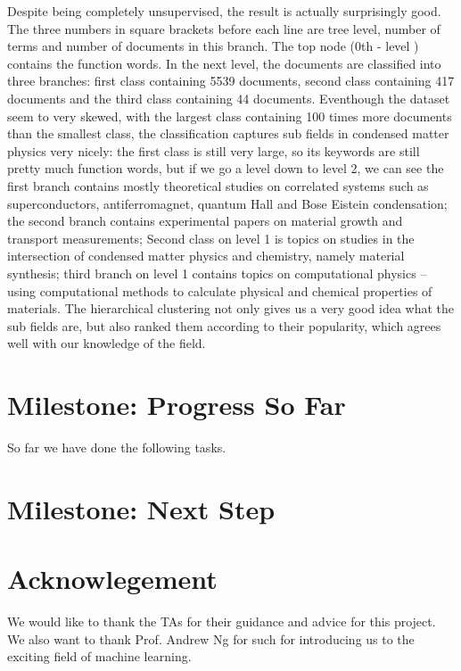 \documentclass[DIV=calc, paper=a4, fontsize=11pt, twocolumn]{scrartcl}	 %
\begin{document}
\newline
Despite being completely unsupervised, the result is actually surprisingly good. The three numbers in square brackets before each line are tree level, number of terms and number of documents in this branch. The top node (0th - level ) contains the function words. In the next level, the documents are classified into three branches: first class containing 5539 documents, second class containing 417 documents and the third class containing 44 documents. Eventhough the dataset seem to very skewed, with the largest class containing 100 times more documents than the smallest class, the classification captures sub fields in condensed matter physics very nicely: the first class is still very large, so its keywords are still pretty much function words, but if we go a level down to level 2, we can see the first branch contains mostly theoretical studies on correlated systems such as superconductors, antiferromagnet, quantum Hall and Bose Eistein condensation; the second branch contains experimental papers on material growth and transport measurements; Second class on level 1 is topics on studies in the intersection of condensed matter physics and chemistry, namely material synthesis; third branch on level 1 contains topics on computational physics -- using computational methods to calculate physical and chemical properties of materials. The hierarchical clustering not only gives us a very good idea what the sub fields are, but also ranked them according to their popularity, which agrees well with our knowledge of the field.      

\section*{Milestone: Progress So Far}
So far we have done the following tasks.


\section*{Milestone: Next Step}


\section*{Acknowlegement}
We would like to thank the TAs for their guidance and advice for this project. We also want to thank Prof. Andrew Ng for such for introducing us to the exciting field of machine learning.  
\end{document}
